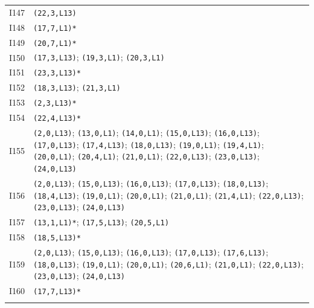 {\begin{longtable}{@{}r p{14.7cm}@{}}
I147 & \texttt{(22,3,L13)}\\\addlinespace[3pt]
I148 & \texttt{(17,7,L1)*}\\\addlinespace[3pt]
I149 & \texttt{(20,7,L1)*}\\\addlinespace[3pt]
I150 & \texttt{(17,3,L13)}; \texttt{(19,3,L1)}; \texttt{(20,3,L1)}\\\addlinespace[3pt]
I151 & \texttt{(23,3,L13)*}\\\addlinespace[3pt]
I152 & \texttt{(18,3,L13)}; \texttt{(21,3,L1)}\\\addlinespace[3pt]
I153 & \texttt{(2,3,L13)*}\\\addlinespace[3pt]
I154 & \texttt{(22,4,L13)*}\\\addlinespace[3pt]
I155 & \texttt{(2,0,L13)}; \texttt{(13,0,L1)}; \texttt{(14,0,L1)}; \texttt{(15,0,L13)}; \texttt{(16,0,L13)}; \texttt{(17,0,L13)}; \texttt{(17,4,L13)}; \texttt{(18,0,L13)}; \texttt{(19,0,L1)}; \texttt{(19,4,L1)}; \texttt{(20,0,L1)}; \texttt{(20,4,L1)}; \texttt{(21,0,L1)}; \texttt{(22,0,L13)}; \texttt{(23,0,L13)}; \texttt{(24,0,L13)}\\\addlinespace[3pt]
I156 & \texttt{(2,0,L13)}; \texttt{(15,0,L13)}; \texttt{(16,0,L13)}; \texttt{(17,0,L13)}; \texttt{(18,0,L13)}; \texttt{(18,4,L13)}; \texttt{(19,0,L1)}; \texttt{(20,0,L1)}; \texttt{(21,0,L1)}; \texttt{(21,4,L1)}; \texttt{(22,0,L13)}; \texttt{(23,0,L13)}; \texttt{(24,0,L13)}\\\addlinespace[3pt]
I157 & \texttt{(13,1,L1)*}; \texttt{(17,5,L13)}; \texttt{(20,5,L1)}\\\addlinespace[3pt]
I158 & \texttt{(18,5,L13)*}\\\addlinespace[3pt]
I159 & \texttt{(2,0,L13)}; \texttt{(15,0,L13)}; \texttt{(16,0,L13)}; \texttt{(17,0,L13)}; \texttt{(17,6,L13)}; \texttt{(18,0,L13)}; \texttt{(19,0,L1)}; \texttt{(20,0,L1)}; \texttt{(20,6,L1)}; \texttt{(21,0,L1)}; \texttt{(22,0,L13)}; \texttt{(23,0,L13)}; \texttt{(24,0,L13)}\\\addlinespace[3pt]
I160 & \texttt{(17,7,L13)*}\\\addlinespace[3pt]
\bottomrule\end{longtable}}
